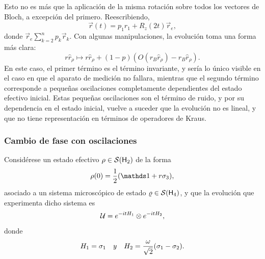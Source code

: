 Esto no es más que la aplicación de la misma rotación sobre todos los vectores de Bloch, a excepción del primero. Reescribiendo,
\begin{equation*}
    \vec{r}(t)=p_{1}r_{1}+R_{z}(2t)\vec{r}_{e},
\end{equation*}
donde $\vec{r}_{e}\sum_{k=2}^{n}p_{k}\vec{r}_{k}$.
Con algunas manipulaciones, la evolución toma una forma más clara:
\begin{equation*}
    r\hat{r}_{\rho}\mapsto r\hat{r}_{\rho}+(1-p)(O(r_{B}\hat{r}_{\rho})-r_{B}\hat{r}_{\rho}).
\end{equation*}
En este caso, el primer término es el término invariante, y sería lo único visible en el caso en que el aparato de medición no fallara, mientras que el segundo término corresponde a pequeñas oscilaciones completamente dependientes del estado efectivo inicial. Estas pequeñas oscilaciones son el término de ruido, y por su dependencia en el estado inicial, vuelve a suceder que la evolución no es lineal, y que no tiene representación en términos de operadores de Kraus.

\subsubsection{Cambio de fase con oscilaciones}

Considérese un estado efectivo $\rho\in\mathcal{S}({\sf H}_{2})$ de la forma
\begin{equation*}
    \rho(0)=\frac{1}{2}(\Id+r\pauli{3}),
\end{equation*}
asociado a un sistema microscópico de estado $\varrho\in\mathcal{S}({\sf H}_{4})$, y que la evolución que experimenta dicho sistema es
\begin{equation*}
    \mathcal{U}=e^{-itH_{1}}\otimes e^{-itH_{2}},
\end{equation*}
donde
\begin{align*}
    H_{1}=\sigma_{1} & & y & &H_{2}=\frac{\omega}{\sqrt{2}}(\sigma_{1}-\sigma_{2}).
\end{align*}

